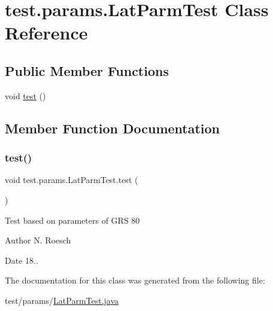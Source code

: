 \hypertarget{classtest_1_1params_1_1_lat_parm_test}{}\section{test.\+params.\+Lat\+Parm\+Test Class Reference}
\label{classtest_1_1params_1_1_lat_parm_test}
\subsection*{Public Member Functions}
\begin{DoxyCompactItemize}
\item 
void \hyperlink{classtest_1_1params_1_1_lat_parm_test_a86997d211c22da67b66dccea5af09e90}{test} ()
\end{DoxyCompactItemize}


\subsection{Member Function Documentation}
\mbox{\label{classtest_1_1params_1_1_lat_parm_test_a86997d211c22da67b66dccea5af09e90}} 
\subsubsection{\texorpdfstring{test()}{test()}}
{\footnotesize\ttfamily void test.\+params.\+Lat\+Parm\+Test.\+test (\begin{DoxyParamCaption}{ }\end{DoxyParamCaption})}

Test based on parameters of G\+RS 80 \begin{DoxyAuthor}{Author}
N. Roesch 
\end{DoxyAuthor}
\begin{DoxyDate}{Date}
18..
\end{DoxyDate}


The documentation for this class was generated from the following file\+:\begin{DoxyCompactItemize}
\item 
test/params/\hyperlink{_lat_parm_test_8java}{Lat\+Parm\+Test.\+java}\end{DoxyCompactItemize}
